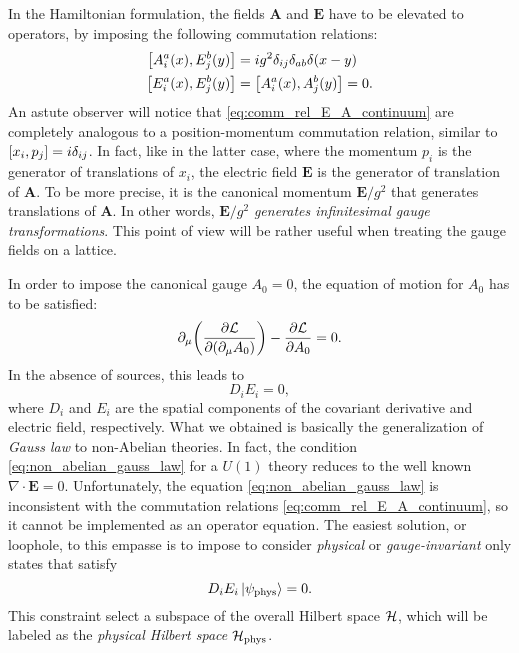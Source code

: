 In the Hamiltonian formulation, the fields $\mathbf{A}$ and $\mathbf{E}$ have to be elevated to operators, by imposing the following commutation relations:
\begin{equation}
    \begin{split}
        \comm{A^a_i(x)}{E^b_j(y)} & = i g^2 \delta_{ij} \delta_{ab} \delta(x-y) \\
        \comm{E^a_i(x)}{E^b_j(y)} & = \comm{A^a_i(x)}{A^b_j(y)} = 0.
    \end{split}
    \label{eq:comm_rel_E_A_continuum}
\end{equation}
An astute observer will notice that \eqref{eq:comm_rel_E_A_continuum} are completely analogous to a position-momentum commutation relation, similar to $\comm{x_i}{p_j} = i \delta_{ij}$.
In fact, like in the latter case, where the momentum $p_i$ is the generator of translations of $x_i$, the electric field $\mathbf{E}$ is the generator of translation of $\mathbf{A}$.
To be more precise, it is the canonical momentum $\mathbf{E}/g^2$ that generates translations of $\mathbf{A}$.
In other words, $\mathbf{E}/g^2$ \emph{generates infinitesimal gauge transformations}.
This point of view will be rather useful when treating the gauge fields on a lattice.


In order to impose the canonical gauge $A_0 = 0$, the equation of motion for $A_0$ has to be satisfied:
\begin{equation}
    \partial_{\mu} \qty( \pdv{\mathcal{L}}{(\partial_{\mu} A_0)} ) - \pdv{\mathcal{L}}{A_0} = 0.
\end{equation}
In the absence of sources, this leads to
\begin{equation}
    D_i E_i = 0,
    \label{eq:non_abelian_gauss_law}
\end{equation}
where $D_i$ and $E_i$ are the spatial components of the covariant derivative and electric field, respectively.
What we obtained is basically the generalization of \emph{Gauss law} to non-Abelian theories.
In fact, the condition \eqref{eq:non_abelian_gauss_law} for a $U(1)$ theory reduces to the well known $\nabla \cdot \mathbf{E} = 0$.
Unfortunately, the equation \eqref{eq:non_abelian_gauss_law} is inconsistent with the commutation relations \eqref{eq:comm_rel_E_A_continuum}, so it cannot be implemented as an operator equation.
The easiest solution, or loophole, to this empasse is to impose to consider \emph{physical} or \emph{gauge-invariant} only states that satisfy
\begin{equation}
    D_i E_i \ket{\psi_{\text{phys}}} = 0.
\end{equation}
This constraint select a subspace of the overall Hilbert space $\mathcal{H}$, which will be labeled as the \emph{physical Hilbert space} $\mathcal{H}_{\text{phys}}$.


